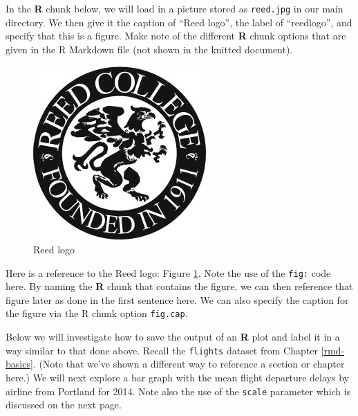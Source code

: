 \documentclass[12pt,twoside]{reedthesis}
\begin{document}
  In the \textbf{R} chunk below, we will load in a picture stored as
  \texttt{reed.jpg} in our main directory. We then give it the caption of
  ``Reed logo'', the label of ``reedlogo'', and specify that this is a
  figure. Make note of the different \textbf{R} chunk options that are
  given in the R Markdown file (not shown in the knitted document).
  
  \begin{Shaded}
  \begin{Highlighting}[]
  \NormalTok{(} \NormalTok{)}
  \end{Highlighting}
  \end{Shaded}
  
  \begin{figure}
  
  {\centering \includegraphics{figure/reed} 
  
  }
  
  \caption[Reed logo]{Reed logo}\label{fig:reedlogo}
  \end{figure}
  
  Here is a reference to the Reed logo: Figure \ref{fig:reedlogo}. Note
  the use of the \texttt{fig:} code here. By naming the \textbf{R} chunk
  that contains the figure, we can then reference that figure later as
  done in the first sentence here. We can also specify the caption for the
  figure via the R chunk option \texttt{fig.cap}.
  
  \clearpage 
  
  Below we will investigate how to save the output of an \textbf{R} plot
  and label it in a way similar to that done above. Recall the
  \texttt{flights} dataset from Chapter \ref{rmd-basics}. (Note that we've
  shown a different way to reference a section or chapter here.) We will
  next explore a bar graph with the mean flight departure delays by
  airline from Portland for 2014. Note also the use of the \texttt{scale}
  parameter which is discussed on the next page.
  
\end{document}
